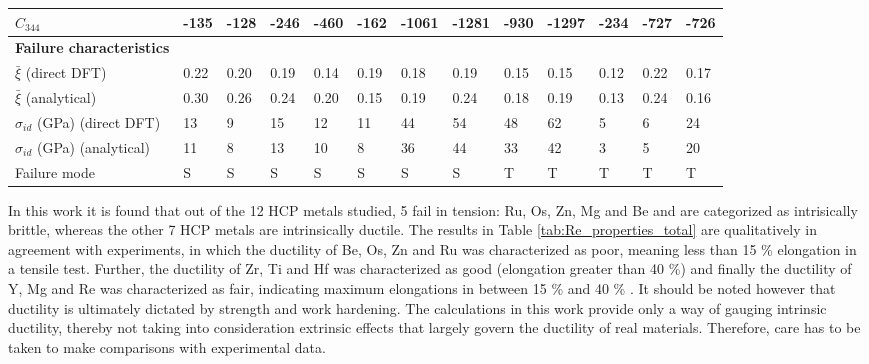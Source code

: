 \documentclass[showpacs,aps,floatfix,prb,reprint,superscriptaddress]{revtex4-1}
\begin{document}
\begin{table}
\begin{ruledtabular}
\begin{tabular}{l l l l l l l l l l l l l}
$C_{344}$ & -135 & -128   & -246  & -460  & -162  & -1061 & -1281 & -930 & -1297 & -234 & -727 & -726 \\
\hline
\textbf{Failure characteristics} & & & & & & & & & & & & \\
$\bar{\xi}$ (direct DFT) & 0.22 & 0.20 & 0.19 & 0.14 & 0.19 & 0.18 & 0.19 & 0.15 & 0.15 &  0.12 & 0.22 & 0.17 \\
$\bar{\xi}$ (analytical) & 0.30 & 0.26 & 0.24 & 0.20 & 0.15 & 0.19 & 0.24 & 0.18 & 0.19 &  0.13 & 0.24 & 0.16 \\
$\sigma_{id}$ (GPa) (direct DFT) & 13 & 9 & 15 & 12 & 11 & 44 & 54 & 48 & 62 & 5 & 6 & 24 \\
$\sigma_{id}$ (GPa) (analytical) & 11 & 8 & 13 & 10 & 8  & 36 & 44 & 33 & 42 & 3 & 5 & 20 \\
Failure mode & S & S & S & S & S & S & S & T & T & T & T & T \\
\end{tabular}
\end{ruledtabular}
\end{table}


In this work it is found that out of the 12 HCP metals studied, 5 fail in tension: Ru, Os, Zn, Mg and Be and are categorized as intrisically brittle, whereas the other 7 HCP metals are intrinsically ductile. The results in Table \ref{tab:Re_properties_total} are qualitatively in agreement with experiments, in which the ductility of Be, Os, Zn and Ru was characterized as poor, meaning less than 15 \% elongation in a tensile test. Further, the ductility of Zr, Ti and Hf was characterized as good (elongation greater than 40 \%) and finally the ductility of Y, Mg and Re was characterized as fair, indicating maximum elongations in between 15 \% and 40 \% \cite{yoo1981slip}. It should be noted however that ductility is ultimately dictated by strength and work hardening. The calculations in this work provide only a way of gauging intrinsic ductility, thereby not taking into consideration extrinsic effects that largely govern the ductility of real materials. Therefore, care has to be taken to make comparisons with experimental data. 

 
\end{document}
